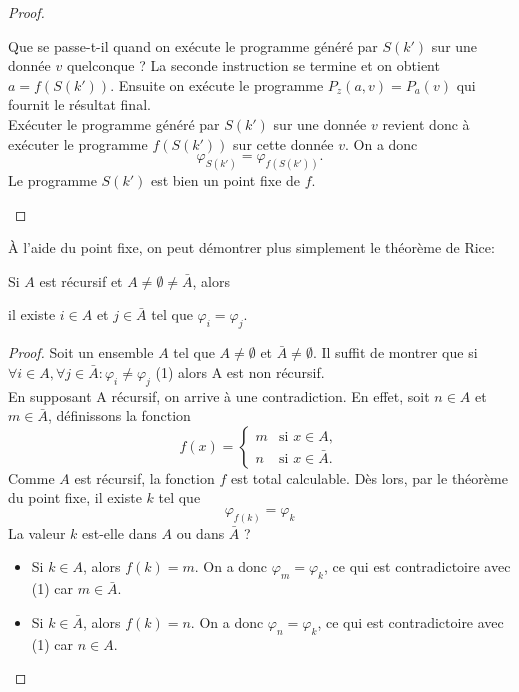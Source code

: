 \begin{proof}
\begin{myrem}
          Que se passe-t-il quand on exécute le programme généré par $S(k')$ sur une donnée $v$ quelconque ?
          La seconde instruction se termine et on obtient $a = f(S(k'))$.
          Ensuite on exécute le programme $P_z(a,v) = P_a(v)$ qui fournit le résultat final. \\
          Exécuter le programme généré par $S(k')$ sur une donnée $v$ revient donc à exécuter le programme $f(S(k'))$ sur cette donnée $v$.
          On a donc 
          \[ \varphi_{S(k')} = \varphi_{f(S(k'))}. \]
          Le programme $S(k')$ est bien un point fixe de $f$.
		\end{myrem}
\end{proof}

\begin{myrem}
  À l'aide du point fixe, on peut démontrer plus simplement le théorème de Rice:

  Si $A$ est récursif et $A \neq \emptyset \neq \bar{A}$, alors

  il existe $i \in A$ et $j \in \bar{A}$ tel que $\varphi_i = \varphi_j$.
 
  \begin{proof}
    Soit un ensemble $A$ tel que $A \neq \emptyset$ et $\bar{A} \neq \emptyset$.  Il suffit de montrer que si 
    $\forall i \in A, \forall j \in \bar{A} : \varphi_i \neq \varphi_j$  (1) alors A est non récursif. \\
    En supposant A récursif, on arrive à une contradiction.  En effet,
    soit $n \in A$ et $m \in \bar{A}$, définissons la fonction
    \[
      f(x) =
      \begin{cases}
        m & \text{si }x \in A,\\
        n & \text{si }x \in \bar{A}.
      \end{cases}
    \]
    Comme $A$ est récursif, la fonction $f$ est total calculable.
    Dès lors, par le théorème du point fixe, il existe $k$ tel que
    \[ \varphi_{f(k)} = \varphi_k \]
    La valeur $k$ est-elle dans $A$ ou dans $\bar{A}$ ?
    \begin{itemize}
      \item Si $k \in A$, alors $f(k)=m$.  On a donc $\varphi_m = \varphi_k$, ce qui est contradictoire avec (1) car 
       $m \in \bar{A}$.
      \item Si $k \in \bar{A}$, alors $f(k)=n$.  On a donc $\varphi_n = \varphi_k$, ce qui est contradictoire avec (1) car 
        $n \in A$.
    \end{itemize}
  \end{proof}
\end{myrem}

